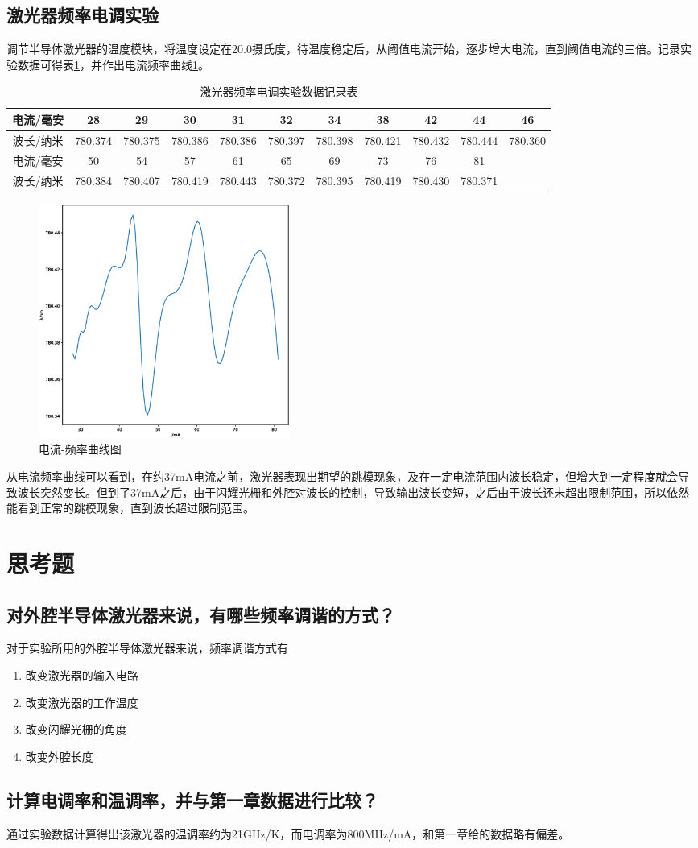 \documentclass{article}
\begin{document}
\begin{CJK}{UTF8}{gkai}
\subsection{激光器频率电调实验}
调节半导体激光器的温度模块，将温度设定在20.0摄氏度，待温度稳定后，从阈值电流开始，逐步增大电流，直到阈值电流的三倍。记录实验数据可得表\ref{t3.1}，并作出电流频率曲线\ref{f2.1}。\\
\begin{table}[H]
\centering
  \caption{激光器频率电调实验数据记录表}
  \label{t3.1}
  \begin{tabular}{|c|c|c|c|c|c|c|c|c|c|c|}
    \hline
    电流/毫安&28&29&30&31&32&34&38&42&44&46\\
    \hline
    波长/纳米&780.374&780.375&780.386&780.386&780.397&780.398&780.421&780.432&780.444&780.360\\
    \hline
    电流/毫安&50&54&57&61&65&69&73&76&81&\\
    \hline
    波长/纳米&780.384&780.407&780.419&780.443&780.372&780.395&780.419&780.430&780.371&\\
    \hline
  \end{tabular}
\end{table}
\begin{figure}[H]
  \centering
  \includegraphics[width=0.4\textwidth]{exm1_2.eps}
  \caption{电流-频率曲线图}
  \label{f2.1}
\end{figure}
\indent 从电流频率曲线可以看到，在约37mA电流之前，激光器表现出期望的跳模现象，及在一定电流范围内波长稳定，但增大到一定程度就会导致波长突然变长。但到了37mA之后，由于闪耀光栅和外腔对波长的控制，导致输出波长变短，之后由于波长还未超出限制范围，所以依然能看到正常的跳模现象，直到波长超过限制范围。
\section{思考题}
\subsection{对外腔半导体激光器来说，有哪些频率调谐的方式？}
对于实验所用的外腔半导体激光器来说，频率调谐方式有
\begin{enumerate}
  \item 改变激光器的输入电路
  \item 改变激光器的工作温度
  \item 改变闪耀光栅的角度
  \item 改变外腔长度
\end{enumerate}
\subsection{计算电调率和温调率，并与第一章数据进行比较？}
通过实验数据计算得出该激光器的温调率约为21GHz/K，而电调率为800MHz/mA，和第一章给的数据略有偏差。


\end{CJK}
\end{document}
